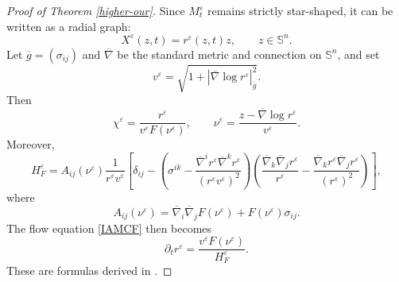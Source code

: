 \documentclass[11pt,reqno]{amsart}
\theoremstyle{definition}
\theoremstyle{remark}
\numberwithin{equation}{section}
\begin{document}
\begin{proof}[Proof of Theorem \ref{higher-our}]
		 Since $M_t^{\varepsilon}$ remains strictly star-shaped, it can be written as a radial graph:
		\begin{equation*}
			X^{\varepsilon}(z,t)=r^{\varepsilon}(z,t)z, \qquad z\in\mathbb S^n.
		\end{equation*}
		Let $\overline{g}=(\sigma_{ij})$ and $\overline{\nabla}$ be the standard metric and connection on $\mathbb{S}^n$, and set
		\begin{equation*}
			v^{\varepsilon}=\sqrt{1+|\overline{\nabla}\log r^{\varepsilon}|_{\overline{g}}^2}.
		\end{equation*}
		Then
		\begin{equation*}
			\chi^{\varepsilon}=\frac{r^{\varepsilon}}{v^{\varepsilon}F(\nu^{\varepsilon})},\qquad \nu^{\varepsilon}=\dfrac{z-\overline{\nabla}\log r^{\varepsilon}}{v^{\varepsilon}}.
		\end{equation*}
		Moreover,
		\begin{equation}\label{s4.HF}
			H_F^{\varepsilon} = A_{ij}(\nu^{\varepsilon})\dfrac{1}{r^{\varepsilon}v^{\varepsilon}}\left[ \delta_{ij} - \left(\sigma^{ik}-\dfrac{\overline{\nabla}^i r^{\varepsilon}\overline{\nabla}^k r^{\varepsilon}}{(r^{\varepsilon}v^{\varepsilon})^2} \right)\left( \dfrac{\overline{\nabla}_k\overline{\nabla}_j r^{\varepsilon}}{r^{\varepsilon}} - \dfrac{\overline{\nabla}_k r^{\varepsilon} \overline{\nabla}_j r^{\varepsilon}}{(r^{\varepsilon})^2} \right) \right],
		\end{equation}
		where
		\begin{equation*}
			A_{ij}(\nu^{\varepsilon}) = \overline{\nabla}_i\overline{\nabla}_j F(\nu^{\varepsilon})+F(\nu^{\varepsilon})\sigma_{ij}.
		\end{equation*}
		The flow equation \eqref{IAMCF} then becomes
		\begin{equation}
			\label{equ-r}
			\partial_t r^{\varepsilon}=\frac{v^{\varepsilon} F(\nu^{\varepsilon})}{H_F^{\varepsilon}}.
		\end{equation}
		These are formulas derived in \cite[Section 4]{Xia17}.


\end{proof}
\end{document}

